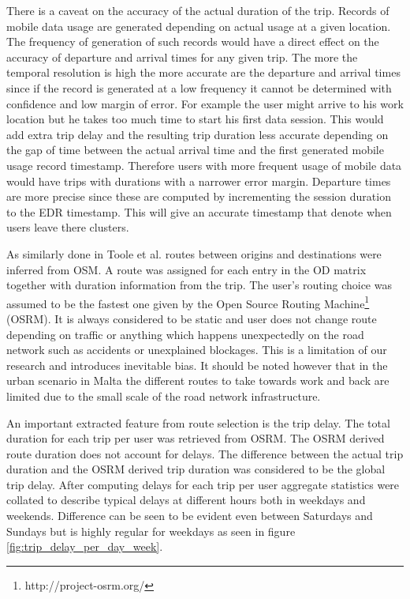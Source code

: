 \documentclass[12pt, a4paper]{report}
\theoremstyle{definition}
\theoremstyle{definition}%
\theoremstyle{definition}%
\theoremstyle{definition}%
\theoremstyle{definition}%
\theoremstyle{definition}%
\begin{document}

There is a caveat on the accuracy of the actual duration of the trip. Records of mobile data usage are generated depending on actual usage at a given location. The frequency of generation of such records would have a direct effect on the accuracy of departure and arrival times for any given trip. The more the temporal resolution is high the more accurate are the departure and arrival times since if the record is generated at a low frequency it cannot be determined with confidence and low margin of error. For example the user might arrive to his work location but he takes too much time to start his first data session. This would add extra trip delay and the resulting trip duration less accurate depending on the gap of time between the actual arrival time and the first generated mobile usage record timestamp. Therefore users with more frequent usage of mobile data would have trips with durations with a narrower error margin. Departure times are more precise since these are computed by incrementing the session duration to the EDR timestamp. This will give an accurate timestamp that denote when users leave there clusters.   


As similarly done in Toole et al. \cite{Toole2015} routes between origins and destinations were inferred from OSM. A route was assigned for each entry in the OD matrix together with duration information from the trip. The user's routing choice was assumed to be the fastest one given by the Open Source Routing Machine\footnote{http://project-osrm.org/} (OSRM). It is always considered to be static and user does not change route depending on traffic or anything which happens unexpectedly on the road network such as accidents or unexplained blockages. This is a limitation of our research and introduces inevitable bias. It should be noted however that in the urban scenario in Malta the different routes to take towards work and back are limited due to the small scale of the road network infrastructure. 

An important extracted feature from route selection is the trip delay. The total duration for each trip per user was retrieved from OSRM. The OSRM derived route duration does not account for delays. The difference between the actual trip duration and the OSRM derived trip duration was considered to be the global trip delay. After computing delays for each trip per user aggregate statistics were collated to describe typical delays at different hours both in weekdays and weekends. Difference can be seen to be evident even between Saturdays and Sundays but is highly regular for weekdays as seen in figure  \ref{fig:trip_delay_per_day_week}.
\end{document}
